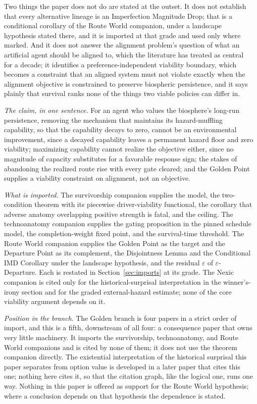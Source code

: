 \documentclass[11pt]{article}
\theoremstyle{plain}
\theoremstyle{definition}
\theoremstyle{remark}
\begin{document}
Two things the paper does not do are stated at the outset. It does not
establish that every alternative lineage is an Imperfection Magnitude
Drop; that is a conditional corollary of the Route World companion,
under a landscape hypothesis stated there, and it is imported at that
grade and used only where marked. And it does not answer the alignment
problem's question of what an artificial agent should be aligned to,
which the literature has treated as central for a decade; it identifies a
preference-independent viability boundary, which becomes a constraint
that an aligned system must not violate exactly when the alignment
objective is constrained to preserve biospheric persistence, and it
says plainly that survival ranks none of the things two viable policies
can differ in.

\emph{The claim, in one sentence.} For an agent who values the
biosphere's long-run persistence, removing the mechanism that
maintains its hazard-muffling capability, so that the capability decays
to zero, cannot be an environmental improvement, since a decayed
capability leaves a permanent hazard floor and zero viability;
maximizing capability cannot realize the objective either, since no
magnitude of capacity substitutes for a favorable response sign; the
stakes of abandoning the realized route rise with every gate cleared;
and the Golden Point supplies a viability constraint on alignment, not
an objective.

\emph{What is imported.} The survivorship companion \cite{SurvA}
supplies the model, the two-condition theorem with its piecewise
driver-viability functional, the corollary that adverse anatomy
overlapping positive strength is fatal, and the ceiling. The
technoanatomy companion \cite{TechnoC} supplies the gating proposition
in the pinned schedule model, the completion-weight fixed point, and the
survival-time threshold. The Route World companion \cite{RouteWorld}
supplies the Golden Point as the target and the Departure Point as its
complement, the Disjointness Lemma and the Conditional IMD Corollary
under the landscape hypothesis, and the residual $\varepsilon$ of
$\varepsilon$-Departure. Each is restated in Section~\ref{sec:imports}
at its grade. The Nexic companion \cite{Nexus} is cited only for the
historical-surprisal interpretation in the winner's-irony section and
for the graded external-hazard estimate; none of the core viability
argument depends on it.

\emph{Position in the branch.} The Golden branch is four papers in a
strict order of import, and this is a fifth, downstream of all four: a
consequence paper that owns very little machinery. It imports the
survivorship, technoanatomy, and Route World companions and is cited
by none of them; it does not use the theorem companion directly. The
existential interpretation of the historical surprisal this paper
separates from option value is developed in a later paper that cites
this one; nothing here cites it, so that the citation graph, like the
logical one, runs one way. Nothing in this paper is offered as support for the Route World
hypothesis; where a conclusion depends on that hypothesis the
dependence is stated.
\end{document}
